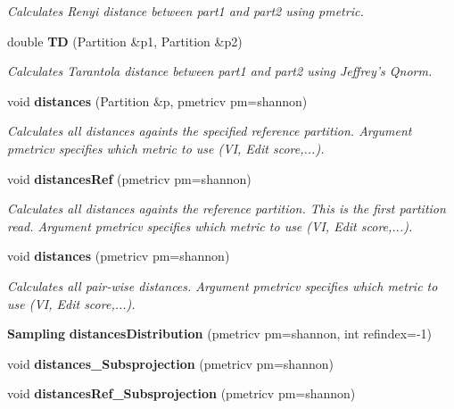 \begin{CompactItemize}
\begin{CompactList}\small\item\em Calculates Renyi distance between part1 and part2 using pmetric. \item\end{CompactList}\item 
double {\bf TD} (Partition \&p1, Partition \&p2)\label{classPartitionStats_a37}

\begin{CompactList}\small\item\em Calculates Tarantola distance between part1 and part2 using Jeffrey's Qnorm. \item\end{CompactList}\item 
void {\bf distances} (Partition \&p, pmetricv pm=shannon)\label{classPartitionStats_a38}

\begin{CompactList}\small\item\em Calculates all distances againts the specified reference partition. Argument pmetricv specifies which metric to use (VI, Edit score,...). \item\end{CompactList}\item 
void {\bf distances\-Ref} (pmetricv pm=shannon)\label{classPartitionStats_a39}

\begin{CompactList}\small\item\em Calculates all distances againts the reference partition. This is the first partition read. Argument pmetricv specifies which metric to use (VI, Edit score,...). \item\end{CompactList}\item 
void {\bf distances} (pmetricv pm=shannon)\label{classPartitionStats_a40}

\begin{CompactList}\small\item\em Calculates all pair-wise distances. Argument pmetricv specifies which metric to use (VI, Edit score,...). \item\end{CompactList}\item 
{\bf Sampling} {\bf distances\-Distribution} (pmetricv pm=shannon, int refindex=-1)
\item 
void {\bf distances\_\-Subsprojection} (pmetricv pm=shannon)
\item 
void {\bf distances\-Ref\_\-Subsprojection} (pmetricv pm=shannon)\label{classPartitionStats_a43}


\end{CompactItemize}
